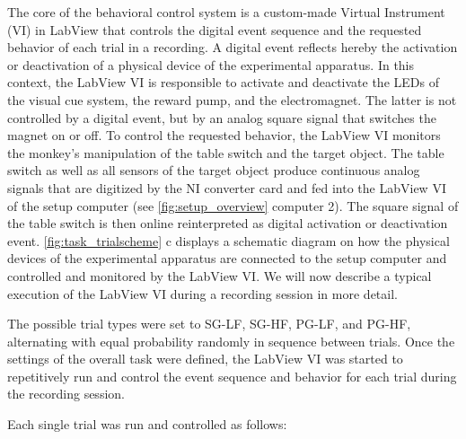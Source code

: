 {The core of the behavioral control system is a custom-made Virtual Instrument (VI) in LabView that controls the digital event sequence and the requested behavior of each trial in a recording. A digital event reflects hereby the activation or deactivation of a physical device of the experimental apparatus. In this context, the LabView VI is responsible to activate and deactivate the LEDs of the visual cue system, the reward pump, and the electromagnet. The latter is not controlled by a digital event, but by an analog square signal that switches the magnet on or off. To control the requested behavior, the LabView VI monitors the monkey's manipulation of the table switch and the target object. The table switch as well as all sensors of the target object produce continuous analog signals that are digitized by the NI converter card and fed into the LabView VI of the setup computer (see \cref{fig:setup_overview} computer 2). The square signal of the table switch is then online reinterpreted as digital activation or deactivation event. \cref{fig:task_trialscheme} c displays a schematic diagram on how the physical devices of the experimental apparatus are connected to the setup computer and controlled and monitored by the LabView VI. We will now describe a typical execution of the LabView VI during a recording session in more detail. 

The possible trial types were set to SG-LF, SG-HF, PG-LF, and PG-HF, alternating with equal probability randomly in sequence between trials. Once the settings of the overall task were defined, the LabView VI was started to repetitively run and control the event sequence and behavior for each trial during the recording session. 

Each single trial was run and controlled as follows: 

}
